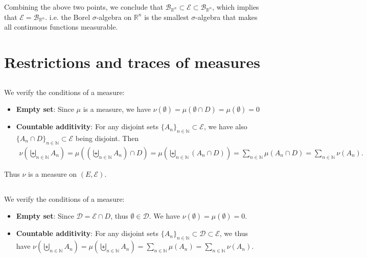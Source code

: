 \documentclass[11pt,a4paper]{article}
\numberwithin{equation}{section}%
\begin{document}
    Combining the above two points, we conclude that $ \mathcal{B}_{\mathbb{R}^n} \subset \mathcal{E} \subset \mathcal{B}_{\mathbb{R}^n} $, which implies that $ \mathcal{E} = \mathcal{B}_{\mathbb{R}^n} $. i.e. the Borel $ \sigma $-algebra on $ \mathbb{R}^n $ is the smallest $ \sigma $-algebra that makes all continuous functions measurable.












\section{Restrictions and traces of measures}

\subsection{}
We verify the conditions of a measure:
\begin{itemize}[topsep=2pt,itemsep=0pt]
    \item \textbf{Empty set}: Since $ \mu $ is a measure, we have $ \nu(\emptyset)=\mu (\emptyset \cap D) = \mu(\emptyset) =0 $
    \item \textbf{Countable additivity}: For any disjoint sets $ \{A_n\}_{n\in \mathbb{N}}\subset \mathcal{E}$, we have also $ \{A_n\cap D\}_{n\in \mathbb{N}}\subset \mathcal{E} $ being disjoint. Then
    \begin{align*}
        \nu(\biguplus_{n\in \mathbb{N}} A_n) = \mu\left( \left( \biguplus_{n\in \mathbb{N}} A_n \right) \cap D \right) = \mu\left( \biguplus_{n\in \mathbb{N}} (A_n\cap D) \right) = \sum_{n\in \mathbb{N}} \mu(A_n\cap D) = \sum_{n\in \mathbb{N}} \nu(A_n).
    \end{align*}   
    
\end{itemize}

Thus $ \nu $ is a measure on $ (E,\mathcal{E}) $.

\subsection{}

We verify the conditions of a measure:
\begin{itemize}[topsep=2pt,itemsep=0pt]
    \item \textbf{Empty set}: Since $ \mathcal{D}=\mathcal{E}\cap D $, thus $ \emptyset \in \mathcal{D} $. We have $ \nu(\emptyset) = \mu (\emptyset )=0 $.
    \item \textbf{Countable additivity}: For any disjoint sets $ \{A_n\}_{n\in \mathbb{N}}\subset \mathcal{D} \subset \mathcal{E}$, we thus have $ \nu (\biguplus_{n\in \mathbb{N}} A_n) = \mu \left( \biguplus_{n\in \mathbb{N}} A_n \right) = \sum_{n\in \mathbb{N}} \mu(A_n) = \sum_{n\in \mathbb{N}} \nu(A_n) $.
\end{itemize}
\end{document}
